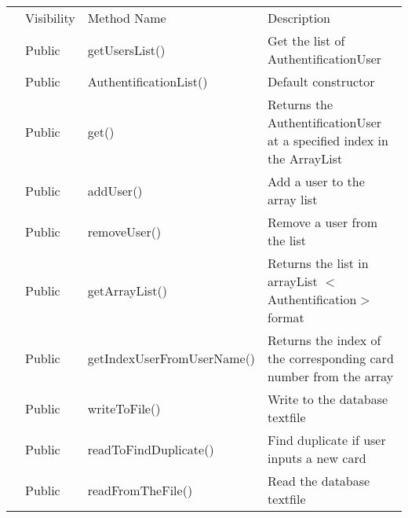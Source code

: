 \documentclass{article}
\begin{document}
\begin{table}[]
\begin{tabular}{|p{2cm}||p{1.5cm}||p{6cm}||p{3cm}||p{3cm}|}
\rowcolor[HTML]{C0C0C0} 
\cellcolor[HTML]{C0C0C0}{\color[HTML]{000000} }                             & Visibility & Method Name & \multicolumn{2}{l|}{\cellcolor[HTML]{C0C0C0}Description} \\ \cline{2-5} 
\multirow{-2}{*}{\cellcolor[HTML]{C0C0C0}{\color[HTML]{000000} Methods}}    &  Public      &  getUsersList()       & \multicolumn{2}{l|}{Get the list of AuthentificationUser }                               \\ \cline{2-5}
\multirow{-2}{*}{\cellcolor[HTML]{C0C0C0}{\color[HTML]{000000} }}    &  Public      &  AuthentificationList()       & \multicolumn{2}{l|}{Default constructor }                               \\ \cline{2-5}
\multirow{-2}{*}{\cellcolor[HTML]{C0C0C0}{\color[HTML]{000000} }}    &  Public      &  get()       & \multicolumn{2}{l|}{Returns the AuthentificationUser at a specified index in the ArrayList}                               \\ \cline{2-5}
\multirow{-2}{*}{\cellcolor[HTML]{C0C0C0}{\color[HTML]{000000} }}    &  Public      & addUser()       & \multicolumn{2}{l|}{Add a user to the array list }                               \\ \cline{2-5}
\multirow{-2}{*}{\cellcolor[HTML]{C0C0C0}{\color[HTML]{000000} }}    &  Public      &  removeUser()      & \multicolumn{2}{l|}{Remove a user from the list }                               \\ \cline{2-5}
\multirow{-2}{*}{\cellcolor[HTML]{C0C0C0}{\color[HTML]{000000} }}    &  Public      &  getArrayList()      & \multicolumn{2}{l|}{Returns the list in arrayList $<$Authentification$>$ format }                               \\ \cline{2-5}
\multirow{-2}{*}{\cellcolor[HTML]{C0C0C0}{\color[HTML]{000000} }}    &  Public      &  getIndexUserFromUserName()      & \multicolumn{2}{l|}{Returns the index of the corresponding card number from the array }                               \\ \cline{2-5}
\multirow{-2}{*}{\cellcolor[HTML]{C0C0C0}{\color[HTML]{000000} }}    &  Public      &  writeToFile()       & \multicolumn{2}{l|}{Write to the database textfile }                               \\ \cline{2-5}
\multirow{-2}{*}{\cellcolor[HTML]{C0C0C0}{\color[HTML]{000000} }}    &  Public      &  readToFindDuplicate()       & \multicolumn{2}{l|}{Find duplicate if user inputs a new card }                               \\ \cline{2-5}
\multirow{-2}{*}{\cellcolor[HTML]{C0C0C0}{\color[HTML]{000000} }}    &  Public      &  readFromTheFile()      & \multicolumn{2}{l|}{Read the database textfile }                               \\ \cline{2-5}

\end{tabular}
\end{table}
\end{document}
